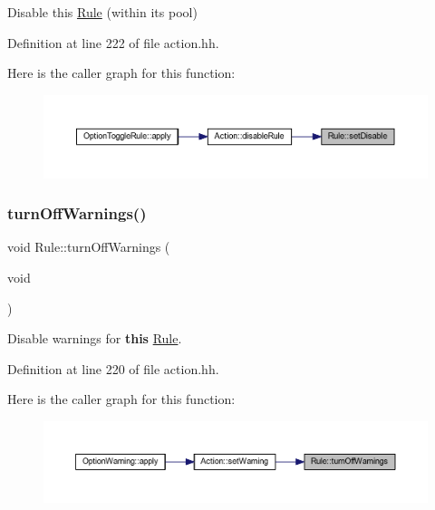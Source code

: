 Disable this \mbox{\hyperlink{class_rule}{Rule}} (within its pool) 



Definition at line 222 of file action.\+hh.

Here is the caller graph for this function\+:
\nopagebreak
\begin{figure}[H]
\begin{center}
\leavevmode
\includegraphics[width=350pt]{class_rule_a257f9d9852eeba56c62a6df47865289b_icgraph}
\end{center}
\end{figure}
\mbox{\label{class_rule_a8b867161722aded2a2fc95141088c758}} 
\subsubsection{\texorpdfstring{turnOffWarnings()}{turnOffWarnings()}}
{\footnotesize\ttfamily void Rule\+::turn\+Off\+Warnings (\begin{DoxyParamCaption}\item[{void}]{ }\end{DoxyParamCaption})\hspace{0.3cm}{\ttfamily [inline]}}



Disable warnings for {\bfseries{this}} \mbox{\hyperlink{class_rule}{Rule}}. 



Definition at line 220 of file action.\+hh.

Here is the caller graph for this function\+:
\nopagebreak
\begin{figure}[H]
\begin{center}
\leavevmode
\includegraphics[width=350pt]{class_rule_a8b867161722aded2a2fc95141088c758_icgraph}
\end{center}
\end{figure}
\mbox{\label{class_rule_a3c8853bae236ab20a20c25907c694914}} 
